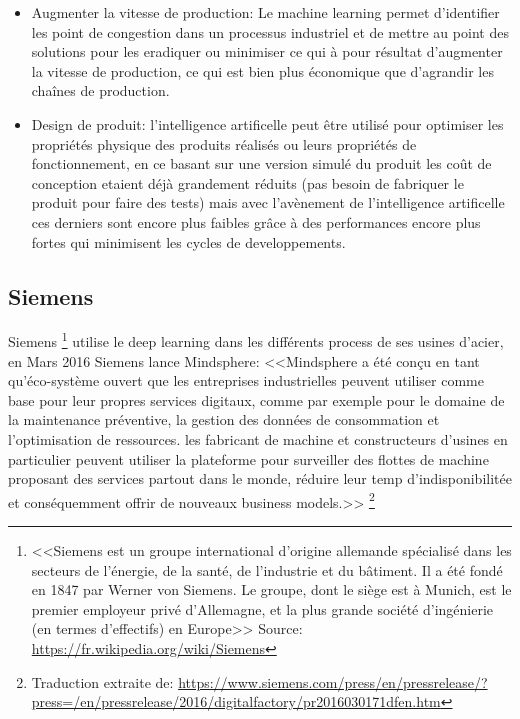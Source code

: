 \begin{itemize}
    \item Augmenter la vitesse de production: Le machine learning permet d'identifier les point 
    de congestion dans un processus industriel et de mettre au point des solutions pour les eradiquer 
    ou minimiser ce qui à pour résultat d'augmenter la vitesse de production, ce qui est bien 
    plus économique que d'agrandir les chaînes de production. \newline 

    \item Design de produit: l'intelligence artificelle peut être utilisé pour optimiser les propriétés 
    physique des produits réalisés ou leurs propriétés de fonctionnement, en ce basant sur une
    version simulé du produit les coût de conception etaient déjà grandement réduits 
    (pas besoin de fabriquer le produit pour faire des tests) mais avec l'avènement de 
    l'intelligence artificelle ces derniers sont encore plus faibles grâce à des performances
    encore plus fortes qui minimisent les cycles de developpements.
    \newline
\end{itemize}

\subsection{Siemens}
Siemens \footnote{<<Siemens est un groupe 
international d’origine allemande spécialisé dans les secteurs de l'énergie, 
de la santé, de l'industrie et du bâtiment. 
Il a été fondé en 1847 par Werner von Siemens. 
Le groupe, dont le siège est à Munich, est le premier employeur privé d'Allemagne, 
et la plus grande société d'ingénierie (en termes d'effectifs) en Europe>> 
Source: \url{https://fr.wikipedia.org/wiki/Siemens}}
utilise le deep learning dans les différents process de ses usines d'acier,
en Mars 2016 Siemens lance Mindsphere: 
<<Mindsphere a été conçu en tant qu'éco-système ouvert que les entreprises industrielles
peuvent utiliser comme base pour leur propres services digitaux, comme par exemple pour 
le domaine de la maintenance préventive, la gestion des données de consommation et 
l'optimisation de ressources. les fabricant de machine et constructeurs d'usines en particulier
peuvent utiliser la plateforme pour surveiller des flottes de machine proposant des
services partout dans le monde, réduire leur temp d'indisponibilitée et 
conséquemment offrir de nouveaux business models.>> 
\footnote{Traduction extraite de: \url{https://www.siemens.com/press/en/pressrelease/?press=/en/pressrelease/2016/digitalfactory/pr2016030171dfen.htm}}
\newline



